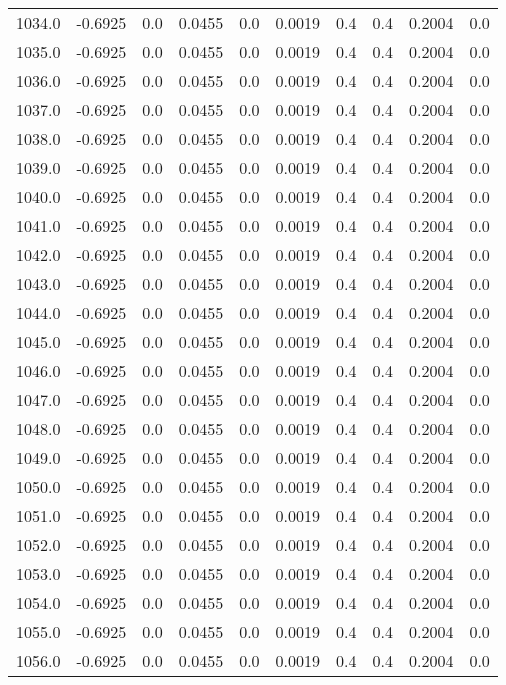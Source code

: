 \begin{longtable}{lrrrrrrrrr}
1034.0 & -0.6925 & 0.0 & 0.0455 & 0.0 & 0.0019 & 0.4 & 0.4 & 0.2004 & 0.0 \\
1035.0 & -0.6925 & 0.0 & 0.0455 & 0.0 & 0.0019 & 0.4 & 0.4 & 0.2004 & 0.0 \\
1036.0 & -0.6925 & 0.0 & 0.0455 & 0.0 & 0.0019 & 0.4 & 0.4 & 0.2004 & 0.0 \\
1037.0 & -0.6925 & 0.0 & 0.0455 & 0.0 & 0.0019 & 0.4 & 0.4 & 0.2004 & 0.0 \\
1038.0 & -0.6925 & 0.0 & 0.0455 & 0.0 & 0.0019 & 0.4 & 0.4 & 0.2004 & 0.0 \\
1039.0 & -0.6925 & 0.0 & 0.0455 & 0.0 & 0.0019 & 0.4 & 0.4 & 0.2004 & 0.0 \\
1040.0 & -0.6925 & 0.0 & 0.0455 & 0.0 & 0.0019 & 0.4 & 0.4 & 0.2004 & 0.0 \\
1041.0 & -0.6925 & 0.0 & 0.0455 & 0.0 & 0.0019 & 0.4 & 0.4 & 0.2004 & 0.0 \\
1042.0 & -0.6925 & 0.0 & 0.0455 & 0.0 & 0.0019 & 0.4 & 0.4 & 0.2004 & 0.0 \\
1043.0 & -0.6925 & 0.0 & 0.0455 & 0.0 & 0.0019 & 0.4 & 0.4 & 0.2004 & 0.0 \\
1044.0 & -0.6925 & 0.0 & 0.0455 & 0.0 & 0.0019 & 0.4 & 0.4 & 0.2004 & 0.0 \\
1045.0 & -0.6925 & 0.0 & 0.0455 & 0.0 & 0.0019 & 0.4 & 0.4 & 0.2004 & 0.0 \\
1046.0 & -0.6925 & 0.0 & 0.0455 & 0.0 & 0.0019 & 0.4 & 0.4 & 0.2004 & 0.0 \\
1047.0 & -0.6925 & 0.0 & 0.0455 & 0.0 & 0.0019 & 0.4 & 0.4 & 0.2004 & 0.0 \\
1048.0 & -0.6925 & 0.0 & 0.0455 & 0.0 & 0.0019 & 0.4 & 0.4 & 0.2004 & 0.0 \\
1049.0 & -0.6925 & 0.0 & 0.0455 & 0.0 & 0.0019 & 0.4 & 0.4 & 0.2004 & 0.0 \\
1050.0 & -0.6925 & 0.0 & 0.0455 & 0.0 & 0.0019 & 0.4 & 0.4 & 0.2004 & 0.0 \\
1051.0 & -0.6925 & 0.0 & 0.0455 & 0.0 & 0.0019 & 0.4 & 0.4 & 0.2004 & 0.0 \\
1052.0 & -0.6925 & 0.0 & 0.0455 & 0.0 & 0.0019 & 0.4 & 0.4 & 0.2004 & 0.0 \\
1053.0 & -0.6925 & 0.0 & 0.0455 & 0.0 & 0.0019 & 0.4 & 0.4 & 0.2004 & 0.0 \\
1054.0 & -0.6925 & 0.0 & 0.0455 & 0.0 & 0.0019 & 0.4 & 0.4 & 0.2004 & 0.0 \\
1055.0 & -0.6925 & 0.0 & 0.0455 & 0.0 & 0.0019 & 0.4 & 0.4 & 0.2004 & 0.0 \\
1056.0 & -0.6925 & 0.0 & 0.0455 & 0.0 & 0.0019 & 0.4 & 0.4 & 0.2004 & 0.0 \\

\end{longtable}
